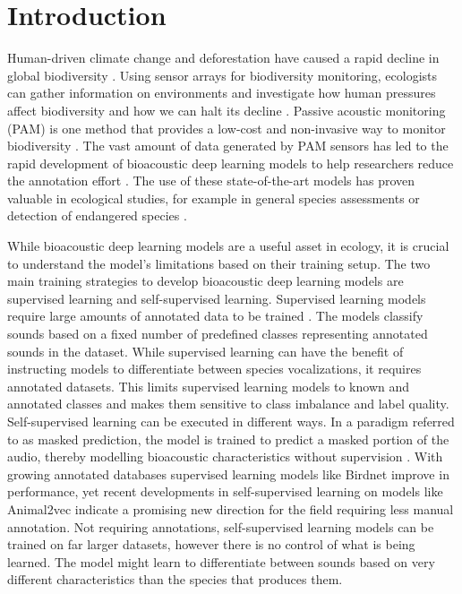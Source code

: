 \section{Introduction}
\label{sec:introcution}

Human-driven climate change and deforestation have caused a rapid decline in global biodiversity \cite{gosselin_relationships_2018}.
Using sensor arrays for biodiversity monitoring, ecologists can gather information on environments and investigate how human pressures affect biodiversity and how we can halt its decline \cite{schmeller_building_2017}.
Passive acoustic monitoring (PAM) is one method that provides a low-cost and non-invasive way to monitor biodiversity \cite{sugai_terrestrial_2019}.
The vast amount of data generated by PAM sensors has led to the rapid development of bioacoustic deep learning models to help researchers reduce the annotation effort \cite{stowell_computational_2022}.
The use of these state-of-the-art models has proven valuable in ecological studies, for example in general species assessments \cite{cowans_improving_2024} or detection of endangered species \cite{allen-ankins_use_2025}.

While bioacoustic deep learning models are a useful asset in ecology, it is crucial to understand the model's limitations based on their training setup.
The two main training strategies to develop bioacoustic deep learning models are supervised learning and self-supervised learning.
Supervised learning models require large amounts of annotated data to be trained \cite{hagiwara_aves_2022}.
The models classify sounds based on a fixed number of predefined classes representing annotated sounds in the dataset.
While supervised learning can have the benefit of instructing models to differentiate between species vocalizations, it requires annotated datasets.
This limits supervised learning models to known and annotated classes and makes them sensitive to class imbalance and label quality.
Self-supervised learning can be executed in different ways.
In a paradigm referred to as masked prediction, the model is trained to predict a masked portion of the audio, thereby modelling bioacoustic characteristics without supervision \cite{huang_masked_2022}.
With growing annotated databases supervised learning models like Birdnet \cite{kahl_birdnet_2021} improve in performance, yet recent developments in self-supervised learning on models like Animal2vec \cite{schafer-zimmermann_animal2vec_2024} indicate a promising new direction for the field requiring less manual annotation.
Not requiring annotations, self-supervised learning models can be trained on far larger datasets, however there is no control of what is being learned.
The model might learn to differentiate between sounds based on very different characteristics than the species that produces them.

